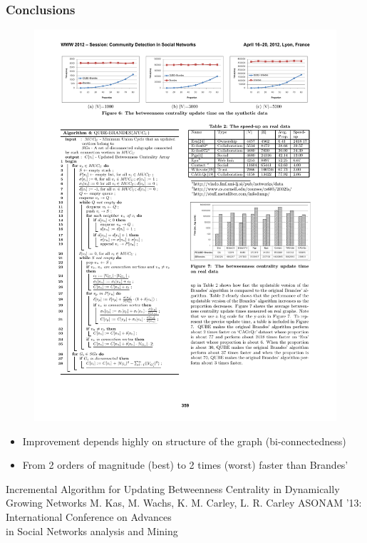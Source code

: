 \begin{frame}
  \frametitle{Conclusions}

  \begin{figure}[t]
    \centering
    \includegraphics[width=\textwidth, height=0.6\textheight, keepaspectratio]{imgs/qube-results2}
  \end{figure}

  \begin{itemize}
    \item Improvement depends highly on structure of the graph (bi-connectedness)
    \item From 2 orders of magnitude (best) to 2 times (worst) faster than Brandes'
  \end{itemize}

\end{frame}


\begin{frame}
  \centering
  \vfill
  {\huge Incremental Algorithm for Updating Betweenness Centrality in Dynamically Growing Networks}
  \vfill
  {\Large M. Kas, M. Wachs, K. M. Carley, L. R. Carley}
  \vfill
  {\large ASONAM '13: International Conference on Advances \\in Social Networks analysis and Mining}
  \vfill
\end{frame}


